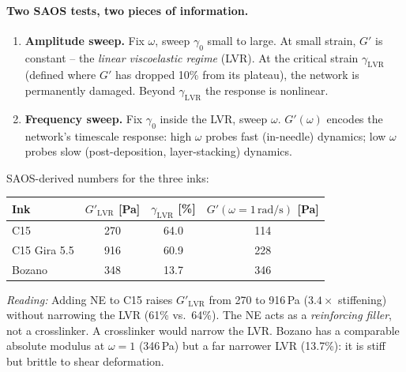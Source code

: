 \documentclass[11pt,a4paper]{article}
\begin{document}
\paragraph{Two SAOS tests, two pieces of information.}

\begin{enumerate}[leftmargin=1.6em,itemsep=2pt]
\item \textbf{Amplitude sweep.} Fix $\omega$, sweep $\gamma_0$ small to
large. At small strain, $G'$ is constant -- the \emph{linear viscoelastic
regime} (LVR). At the critical strain $\gamma_\mathrm{LVR}$ (defined where
$G'$ has dropped 10\% from its plateau), the network is permanently
damaged. Beyond $\gamma_\mathrm{LVR}$ the response is nonlinear.
\item \textbf{Frequency sweep.} Fix $\gamma_0$ inside the LVR, sweep
$\omega$. $G'(\omega)$ encodes the network's timescale response: high
$\omega$ probes fast (in-needle) dynamics; low $\omega$ probes slow
(post-deposition, layer-stacking) dynamics.
\end{enumerate}

\begin{examplebox}
SAOS-derived numbers for the three inks:

\medskip\centering
\begin{tabular}{lccc}
\toprule
Ink & $G'_\mathrm{LVR}$ [\si{\Pa}] & $\gamma_\mathrm{LVR}$ [\%] & $G'(\omega=1\,\si{\radian\per\s})$ [\si{\Pa}] \\
\midrule
C15           & 270    & 64.0   & 114 \\
C15 Gira 5.5  & 916    & 60.9   & 228 \\
Bozano        & 348    & 13.7   & 346 \\
\bottomrule
\end{tabular}

\medskip\flushleft
\emph{Reading:} Adding NE to C15 raises $G'_\mathrm{LVR}$ from 270 to
916\,\si{\Pa} ($3.4\times$ stiffening) without narrowing the LVR (61\%
vs.\ 64\%). The NE acts as a \emph{reinforcing filler}, not a
crosslinker. A crosslinker would narrow the LVR. Bozano has a comparable
absolute modulus at $\omega=1$ (346\,\si{\Pa}) but a far narrower LVR
(13.7\%): it is stiff but brittle to shear deformation.
\end{examplebox}
\end{document}
